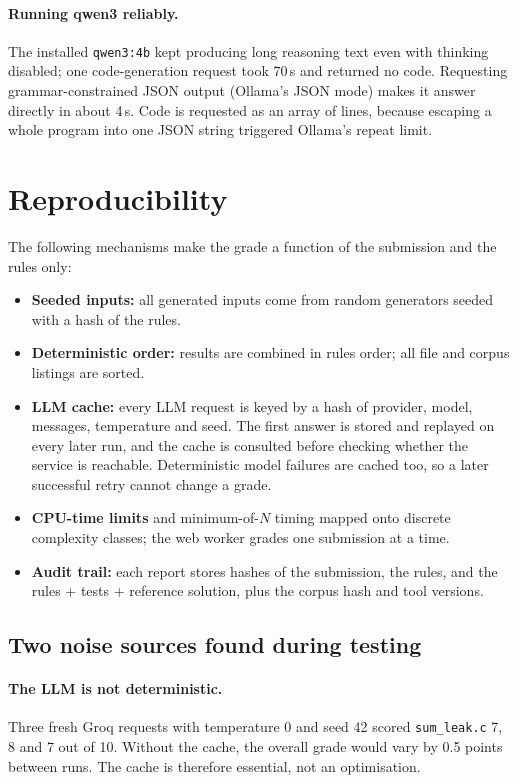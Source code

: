 \documentclass[11pt,a4paper]{article}
\newcommand{\file}[1]{\nolinkurl{#1}}
\begin{document}
\paragraph{Running qwen3 reliably.} The installed \texttt{qwen3:4b} kept producing long reasoning text even with
thinking disabled; one code-generation request took 70\,s and returned no code. Requesting grammar-constrained JSON
output (Ollama's JSON mode) makes it answer directly in about 4\,s. Code is requested as an array of lines, because
escaping a whole program into one JSON string triggered Ollama's repeat limit.

\section{Reproducibility}\label{sec:repro}
The following mechanisms make the grade a function of the submission and the rules only:
\begin{itemize}
  \item \textbf{Seeded inputs:} all generated inputs come from random generators seeded with a hash of the rules.
  \item \textbf{Deterministic order:} results are combined in rules order; all file and corpus listings are sorted.
  \item \textbf{LLM cache:} every LLM request is keyed by a hash of provider, model, messages, temperature and seed. The
        first answer is stored and replayed on every later run, and the cache is consulted before checking whether the
        service is reachable. Deterministic model failures are cached too, so a later successful retry cannot change a grade.
  \item \textbf{CPU-time limits} and minimum-of-$N$ timing mapped onto discrete complexity classes; the web worker grades
        one submission at a time.
  \item \textbf{Audit trail:} each report stores hashes of the submission, the rules, and the rules + tests + reference
        solution, plus the corpus hash and tool versions.
\end{itemize}

\subsection{Two noise sources found during testing}
\paragraph{The LLM is not deterministic.} Three fresh Groq requests with temperature 0 and seed 42 scored
\file{sum_leak.c} 7, 8 and 7 out of 10. Without the cache, the overall grade would vary by 0.5 points between runs.
The cache is therefore essential, not an optimisation.
\end{document}
